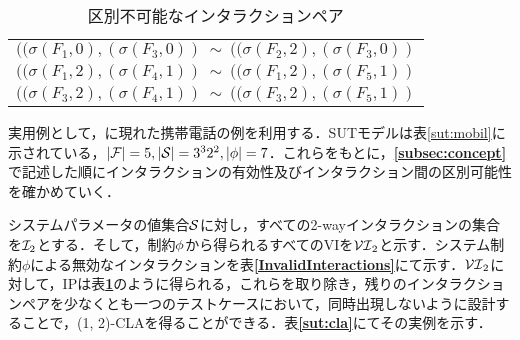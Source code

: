 \documentclass[paper]{ieicej}
\begin{document}
\begin{table}[tb]
	\caption{区別不可能なインタラクションペア}
	\label{IndisPairs}
	\begin{center}
		\begin{tabular}{|l|}
			\hline
			$((\sigma(F_1, 0), (\sigma(F_3, 0))\ \sim\ ((\sigma(F_2, 2), (\sigma(F_3, 0))$ \\ 
			$((\sigma(F_1, 2), (\sigma(F_4, 1))\ \sim\ ((\sigma(F_1, 2), (\sigma(F_5, 1))$ \\
			$((\sigma(F_3, 2), (\sigma(F_4, 1))\ \sim\ ((\sigma(F_3, 2), (\sigma(F_5, 1))$ \\
			\hline
		\end{tabular}
	\end{center}
\end{table}

実用例として，\cite{eg:phone}に現れた携帯電話の例を利用する．SUTモデルは表\ref{sut:mobil}に示されている，$|{\cal F}| = 5, |{\cal S}| = 3^3 2^2, |\phi| = 7$．これらをもとに，{\bfseries \ref{subsec:concept}}で記述した順にインタラクションの有効性及びインタラクション間の区別可能性を確かめていく．

システムパラメータの値集合$\cal S$に対し，すべての2-wayインタラクションの集合を${\cal I}_2$とする．そして，制約$\cal \phi$から得られるすべてのVIを${\cal VI}_2$と示す．システム制約$\phi$による無効なインタラクションを表{\bfseries \ref{InvalidInteractions}}にて示す．${\cal VI}_2$に対して，IPは表{\bfseries \ref{IndisPairs}}のように得られる，これらを取り除き，残りのインタラクションペアを少なくとも一つのテストケースにおいて，同時出現しないように設計することで，(1, 2)-CLAを得ることができる．表{\bfseries \ref{sut:cla}}にてその実例を示す．
\end{document}
